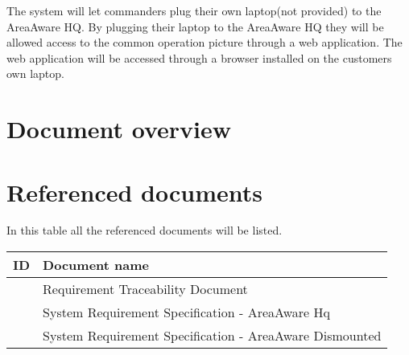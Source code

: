 The system will let commanders plug their own laptop(not provided) to the AreaAware HQ.
By plugging their laptop to the AreaAware HQ they will be allowed access to the common operation picture through a web application. 
The web application will be accessed through a browser installed on the customers own laptop.


\section{Document overview}

\section{Referenced documents}
In this table all the referenced documents will be listed.

\begin{tabular}{b{6cm} b{7cm}}
	\textbf{ID} & \textbf{Document name} \\
	\hline
	\rtm & Requirement Traceability Document \\
	\srshq & System Requirement Specification - AreaAware Hq \\
	\srsdis & System Requirement Specification - AreaAware Dismounted \\
\end{tabular}
